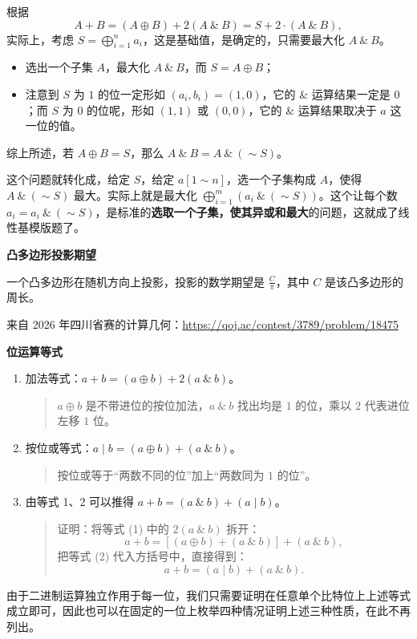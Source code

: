 根据
\[
A+B=(A\oplus B)+2(A\ \&\ B)=S+2\cdot(A\ \&\ B),
\]
实际上，考虑 $S=\bigoplus_{i=1}^{n}a_i$，这是基础值，是确定的，只需要最大化 $A\ \&\ B$。

\begin{itemize}
  \item 选出一个子集 $A$，最大化 $A\ \&\ B$，而 $S=A\oplus B$；
  \item 注意到 $S$ 为 $1$ 的位一定形如 $(a_i,b_i)=(1,0)$，它的 $\&$ 运算结果一定是 $0$；而 $S$ 为 $0$ 的位呢，形如 $(1,1)$ 或 $(0,0)$，它的 $\&$ 运算结果取决于 $a$ 这一位的值。
\end{itemize}
综上所述，若 $A\oplus B=S$，那么 $A\ \&\ B=A\ \&\ (\sim S)$。

这个问题就转化成，给定 $S$，给定 $a[1\sim n]$，选一个子集构成 $A$，使得 $A\ \&\ (\sim S)$ 最大。实际上就是最大化 $\bigoplus_{i=1}^{m}(a_i\ \&\ (\sim S))$。这个让每个数 $a_i=a_i\ \&\ (\sim S)$，是标准的\textbf{选取一个子集，使其异或和最大}的问题，这就成了线性基模版题了。

\par\medskip\noindent\textbf{凸多边形投影期望}\par\smallskip
一个凸多边形在随机方向上投影，投影的数学期望是 $\frac{C}{\pi}$，其中 $C$ 是该凸多边形的周长。

来自 2026 年四川省赛的计算几何：\url{https://qoj.ac/contest/3789/problem/18475}

\par\medskip\noindent\textbf{位运算等式}\par\smallskip
\begin{enumerate}
  \item 加法等式：$a+b=(a\oplus b)+2(a\ \&\ b)$。
  \begin{quote}
    $a\oplus b$ 是不带进位的按位加法，$a\ \&\ b$ 找出均是 $1$ 的位，乘以 $2$ 代表进位左移 $1$ 位。
  \end{quote}
  \item 按位或等式：$a\mid b=(a\oplus b)+(a\ \&\ b)$。
  \begin{quote}
    按位或等于“两数不同的位”加上“两数同为 $1$ 的位”。
  \end{quote}
  \item 由等式 1、2 可以推得 $a+b=(a\ \&\ b)+(a\mid b)$。
  \begin{quote}
    证明：将等式 (1) 中的 $2(a\ \&\ b)$ 拆开：
    \[
    a+b=[(a\oplus b)+(a\ \&\ b)]+(a\ \&\ b),
    \]
    把等式 (2) 代入方括号中，直接得到：
    \[
    a+b=(a\mid b)+(a\ \&\ b).
    \]
  \end{quote}
\end{enumerate}
由于二进制运算独立作用于每一位，我们只需要证明在任意单个比特位上上述等式成立即可，因此也可以在固定的一位上枚举四种情况证明上述三种性质，在此不再列出。

